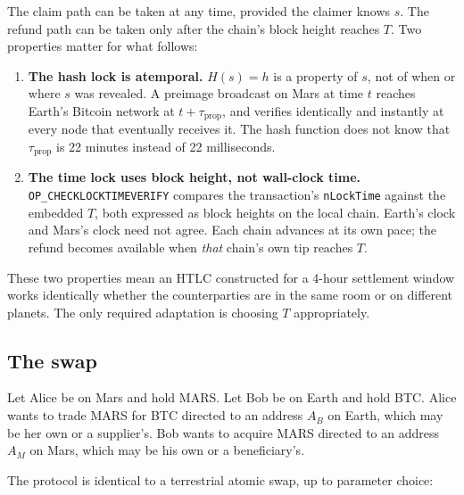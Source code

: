 \documentclass[11pt]{article}
\begin{document}
The claim path can be taken at any time, provided the claimer knows $s$. The refund path can be taken only after the chain's block height reaches $T$. Two properties matter for what follows:

\begin{enumerate}
  \item \textbf{The hash lock is atemporal.} $H(s) = h$ is a property of $s$, not of when or where $s$ was revealed. A preimage broadcast on Mars at time $t$ reaches Earth's Bitcoin network at $t + \tau_{\text{prop}}$, and verifies identically and instantly at every node that eventually receives it. The hash function does not know that $\tau_{\text{prop}}$ is 22 minutes instead of 22 milliseconds.

  \item \textbf{The time lock uses block height, not wall-clock time.} \texttt{OP\_CHECKLOCKTIMEVERIFY} compares the transaction's \texttt{nLockTime} against the embedded $T$, both expressed as block heights on the local chain. Earth's clock and Mars's clock need not agree. Each chain advances at its own pace; the refund becomes available when \emph{that} chain's own tip reaches $T$.
\end{enumerate}

These two properties mean an HTLC constructed for a 4-hour settlement window works identically whether the counterparties are in the same room or on different planets. The only required adaptation is choosing $T$ appropriately.

\subsection{The swap}

Let Alice be on Mars and hold MARS. Let Bob be on Earth and hold BTC. Alice wants to trade MARS for BTC directed to an address $A_B$ on Earth, which may be her own or a supplier's. Bob wants to acquire MARS directed to an address $A_M$ on Mars, which may be his own or a beneficiary's.

The protocol is identical to a terrestrial atomic swap, up to parameter choice:
\end{document}
